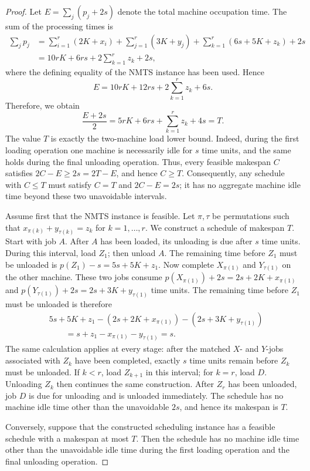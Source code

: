 \documentclass[11pt]{article}
\begin{document}
\begin{proof}
Let \(E=\sum_j(p_j+2s)\) denote the total machine occupation time.
The sum of the processing times is
\[
\begin{aligned}
\sum_j p_j
&=
\sum_{i=1}^r(2K+x_i)
+\sum_{j=1}^r(3K+y_j)
+\sum_{k=1}^r(6s+5K+z_k)
+2s  \\
&=
10rK+6rs+2\sum_{k=1}^r z_k+2s,
\end{aligned}
\]
where the defining equality of the NMTS instance has been used. Hence
\[
E=10rK+12rs+2\sum_{k=1}^r z_k+6s.
\]
Therefore, we obtain 
\[
\frac{E+2s}{2}
=
5rK+6rs+\sum_{k=1}^r z_k+4s
=
T.
\]
The value \(T\) is exactly the two-machine load lower bound. Indeed, during the first
loading operation one machine is necessarily idle for \(s\) time units, and the same
holds during the final unloading operation. Thus, every feasible makespan \(C\) satisfies
\(2C-E\ge2s=2T-E\), and hence \(C\ge T\). Consequently, any schedule with
\(C\le T\) must satisfy \(C=T\) and \(2C-E=2s\); it has no aggregate machine
idle time beyond these two unavoidable intervals.

Assume first that the NMTS instance is feasible. Let \(\pi,\tau\) be permutations such that \(x_{\pi(k)}+y_{\tau(k)}=z_k\) for \(k=1,\ldots,r\).
We construct a schedule of makespan \(T\). Start with job \(A\). After \(A\) has been
loaded, its unloading is due after \(s\) time units. During this interval, load \(Z_1\);
then unload \(A\). The remaining time before \(Z_1\) must be unloaded is \(p(Z_1)-s=5s+5K+z_1\).
Now complete \(X_{\pi(1)}\) and \(Y_{\tau(1)}\) on the other machine. These two jobs consume \(p(X_{\pi(1)})+2s=2s+2K+x_{\pi(1)}\) and \(p(Y_{\tau(1)})+2s=2s+3K+y_{\tau(1)}\) time units. The remaining time before \(Z_1\) must be unloaded is therefore
\[
\begin{aligned}
&5s+5K+z_1
-(2s+2K+x_{\pi(1)})
-(2s+3K+y_{\tau(1)}) \\
&\qquad =
s+z_1-x_{\pi(1)}-y_{\tau(1)}
=s.
\end{aligned}
\]
The same calculation applies at every stage: after the matched \(X\)- and \(Y\)-jobs
associated with \(Z_k\) have been completed, exactly \(s\) time units remain before
\(Z_k\) must be unloaded. If \(k<r\), load \(Z_{k+1}\) in this interval; for
\(k=r\), load \(D\). Unloading \(Z_k\) then continues the same construction. After
\(Z_r\) has been unloaded, job \(D\) is due for unloading and is unloaded immediately.
The schedule has no machine idle time other than the unavoidable \(2s\),
and hence its makespan is \(T\).

Conversely, suppose that the constructed scheduling instance has a feasible schedule
with a makespan at most \(T\). Then the schedule has no machine idle time other than
the unavoidable idle time during the first loading operation and the final unloading
operation.


\end{proof}
\end{document}
